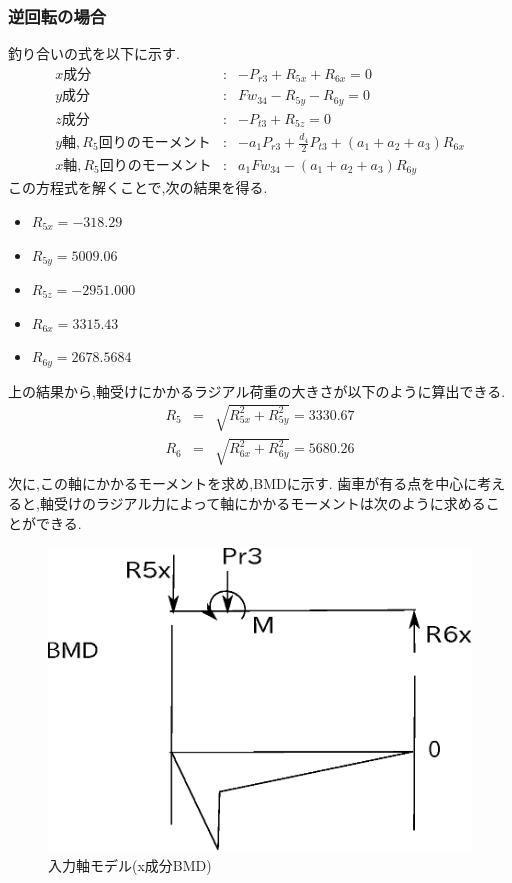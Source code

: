 \subsubsection{逆回転の場合}
釣り合いの式を以下に示す.
\begin{eqnarray}
x成分&:&-P_{r3}+R_{5x}+R_{6x}=0\\
y成分&:&Fw_{34}-R_{5y}-R_{6y}=0\\
z成分&:&-P_{t3}+R_{5z}=0\\
y軸,R_5回りのモーメント&:&-a_1P_{r3}+\frac{d_4}{2}P_{t3}+(a_1+a_2+a_3)R_{6x}\\
x軸,R_5回りのモーメント&:&a_1Fw_{34}-(a_1+a_2+a_3)R_{6y}
\end{eqnarray}
この方程式を解くことで,次の結果を得る.
\begin{itemize}
\item $R_{5x}=-318.29$
\item $R_{5y}=5009.06$
\item $R_{5z}=-2951.000$
\item $R_{6x}=3315.43$
\item $R_{6y}=2678.5684$
\end{itemize}
上の結果から,軸受けにかかるラジアル荷重の大きさが以下のように算出できる.
\begin{eqnarray}
R_5 &=& \sqrt {R_{5x}^2+R_{5y}^2} = 3330.67\\
R_6 &=& \sqrt {R_{6x}^2+R_{6y}^2} = 5680.26\\
\end{eqnarray}
次に,この軸にかかるモーメントを求め,BMDに示す.
歯車が有る点を中心に考えると,軸受けのラジアル力によって軸にかかるモーメントは次のように求めることができる.
\begin{figure}[htbp]
\begin{center}
\includegraphics[width=12cm]{../picture/jiku342.eps}
\end{center}
\caption{入力軸モデル(x成分BMD)}
\end{figure}
